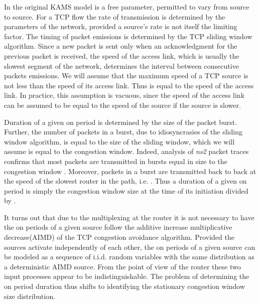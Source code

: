 \documentclass{IEEEtran}[10pt,letterpaper,conference]
\begin{document}
In the original KAMS model  is a free parameter, permitted to vary from source to source. For a TCP flow the rate of transmission is determined by the parameters of the network, provided a source's rate is not itself the limiting factor. The timing of packet emissions is determined by the TCP sliding window algorithm. Since a new packet is sent only when an acknowledgment for the previous packet is received, the speed of the access link, which is usually the slowest segment of the network, determines the interval between consecutive packets emissions. We will assume that the maximum speed of a TCP source is not less than the speed of its access link. Thus  is equal to the speed of the access link. In practice, this assumption is vacuous, since the speed of the access link can be assumed to be equal to the speed of the source if the source is slower.

Duration of a given on period is determined by the size of the packet burst. Further, the number of packets in a burst, due to idiosyncrasies of the sliding window algorithm, is equal to the size of the sliding window, which we will assume is equal to the congestion window. Indeed, analysis of \emph{ns2} packet traces confirms that most packets are transmitted in bursts equal in size to the congestion window \cite{GenMar}. Moreover, packets in a burst are transmitted back to back at the speed of the slowest router in the path, i.e. . Thus a duration of a given on period is simply the congestion window size at the time of its initiation divided by .

It turns out that due to the multiplexing at the router it is not necessary to have the on periods of a given source follow the additive increase multiplicative decrease(AIMD) of the TCP congestion avoidance algorithm. Provided the sources activate independently of each other, the on periods of a given source can be modeled as a sequence of i.i.d. random variables with the same distribution as a deterministic AIMD source. From the point of view of the router these two input processes appear to be indistinguishable. The problem of determining the on period duration thus shifts to identifying the stationary congestion window size distribution.
\end{document}
